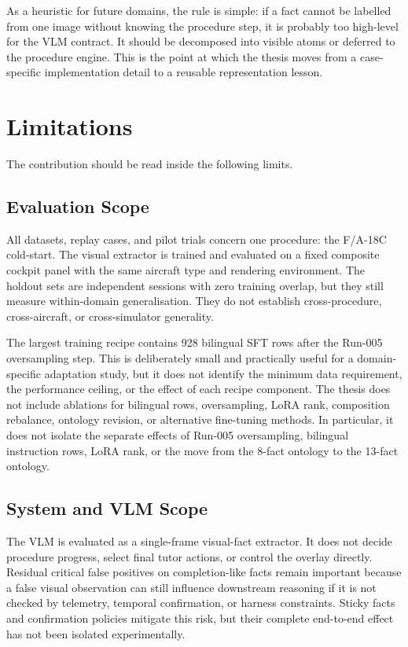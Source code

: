 As a heuristic for future domains, the rule is simple: if a fact cannot be
labelled from one image without knowing the procedure step, it is probably too
high-level for the VLM contract. It should be decomposed into visible atoms or
deferred to the procedure engine. This is the point at which the thesis moves
from a case-specific implementation detail to a reusable representation lesson.

\section{Limitations}\label{sec:disc-limitations}

The contribution should be read inside the following limits.

\subsection{Evaluation Scope}

All datasets, replay cases, and pilot trials concern one procedure: the F/A-18C
cold-start. The visual extractor is trained and evaluated on a fixed composite
cockpit panel with the same aircraft type and rendering environment. The
holdout sets are independent sessions with zero training overlap, but they still
measure within-domain generalisation. They do not establish cross-procedure,
cross-aircraft, or cross-simulator generality.

The largest training recipe contains 928 bilingual SFT rows after the Run-005
oversampling step. This is deliberately small and practically useful for a
domain-specific adaptation study, but it does not identify the minimum data
requirement, the performance ceiling, or the effect of each recipe component.
The thesis does not include ablations for bilingual rows, oversampling, LoRA
rank, composition rebalance, ontology revision, or alternative fine-tuning
methods. In particular, it does not isolate the separate effects of Run-005
oversampling, bilingual instruction rows, LoRA rank, or the move from the
8-fact ontology to the 13-fact ontology.

\subsection{System and VLM Scope}

The VLM is evaluated as a single-frame visual-fact extractor. It does not decide
procedure progress, select final tutor actions, or control the overlay directly.
Residual critical false positives on completion-like facts remain important
because a false visual observation can still influence downstream reasoning if
it is not checked by telemetry, temporal confirmation, or harness constraints.
Sticky facts and confirmation policies mitigate this risk, but their complete
end-to-end effect has not been isolated experimentally.

